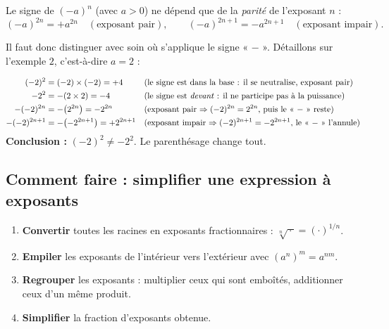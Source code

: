 \documentclass[11pt,a4paper]{article}
\begin{document}
\begin{theoreme}
Le signe de $(-a)^{n}$ (avec $a>0$) ne dépend que de la \emph{parité} de l'exposant $n$ :
\[ (-a)^{2n}=+a^{2n}\quad(\text{exposant pair}),\qquad
   (-a)^{2n+1}=-a^{2n+1}\quad(\text{exposant impair}). \]
\end{theoreme}

\noindent Il faut donc distinguer avec soin où s'applique le signe « $-$ ». Détaillons sur l'exemple
$2$, c'est-à-dire $a=2$ :

\begin{exemple}
\begin{align*}
  (-2)^{2} &= (-2)\times(-2) = +4 &&\text{(le signe est dans la base : il se neutralise, exposant pair)} \\
  -2^{2} &= -(2\times 2) = -4 &&\text{(le signe est \emph{devant} : il ne participe pas à la puissance)} \\
  -(-2)^{2n} &= -\bigl(2^{2n}\bigr) = -2^{2n} &&\text{(exposant pair $\Rightarrow (-2)^{2n}=2^{2n}$, puis le « $-$ » reste)} \\
  -(-2)^{2n+1} &= -\bigl(-2^{2n+1}\bigr) = +2^{2n+1} &&\text{(exposant impair $\Rightarrow (-2)^{2n+1}=-2^{2n+1}$, le « $-$ » l'annule)}
\end{align*}
\textbf{Conclusion :} $(-2)^{2}\neq -2^{2}$. Le parenthésage change tout.
\end{exemple}

\subsection{Comment faire : simplifier une expression à exposants}

\begin{commentfaire}
\begin{enumerate}[leftmargin=2em,topsep=2pt,itemsep=2pt]
  \item \textbf{Convertir} toutes les racines en exposants fractionnaires : $\sqrt[n]{\,\cdot\,}=(\cdot)^{1/n}$.
  \item \textbf{Empiler} les exposants de l'intérieur vers l'extérieur avec $(a^{n})^{m}=a^{nm}$.
  \item \textbf{Regrouper} les exposants : multiplier ceux qui sont emboîtés, additionner ceux d'un même produit.
  \item \textbf{Simplifier} la fraction d'exposants obtenue.
\end{enumerate}
\end{commentfaire}
\end{document}
